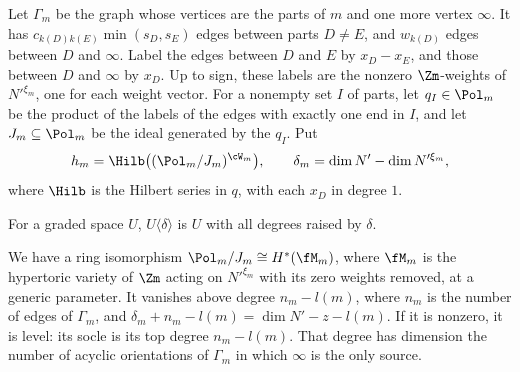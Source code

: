 \documentclass[11pt]{amsart}
\begin{document}
\begin{definition}\label{def:toric-data}
Let $\Gamma_m$ be the graph whose vertices are the parts of $m$ and one more
vertex $\infty$.  It has $c_{k(D)k(E)}\min(s_D,s_E)$ edges between parts
$D\neq E$, and $w_{k(D)}$ edges between $D$ and $\infty$.  Label the edges
between $D$ and $E$ by $x_D-x_E$, and those between $D$ and $\infty$ by $x_D$.
Up to sign, these labels are the nonzero $\Zm$-weights of $N'^{\xi_m}$, one for
each weight vector.  For a nonempty set $I$ of parts, let $q_I\in \Pol_m$ be the
product of the labels of the edges with exactly one end in $I$, and let
$J_m\subseteq \Pol_m$ be the ideal generated by the $q_I$.  Put
\[
 h_m=\Hilb\big((\Pol_m/J_m)^{\cW_m}\big),\qquad
 \delta_m=\dim N'-\dim N'^{\xi_m},
\]
where $\Hilb$ is the Hilbert series in $q$, with each $x_D$ in degree $1$.
\end{definition}
For a graded space $U$, $U\langle\delta\rangle$ is $U$ with all degrees raised by
$\delta$.

\begin{proposition}\label{prop:toric}
We have a ring isomorphism $\Pol_m/J_m\cong H^*(\fM_m)$, where $\fM_m$ is the hypertoric variety
of $\Zm$ acting on $N'^{\xi_m}$ with its zero weights removed, at a generic
parameter.  It vanishes above degree $n_m-l(m)$, where $n_m$ is the number
of edges of $\Gamma_m$, and $\delta_m+n_m-l(m)=\dim N'-z-l(m)$.  If it is
nonzero, it is level: its socle is its top degree $n_m-l(m)$.  That degree
has dimension the number of acyclic orientations of $\Gamma_m$ in which
$\infty$ is the only source.
\end{proposition}
\end{document}
